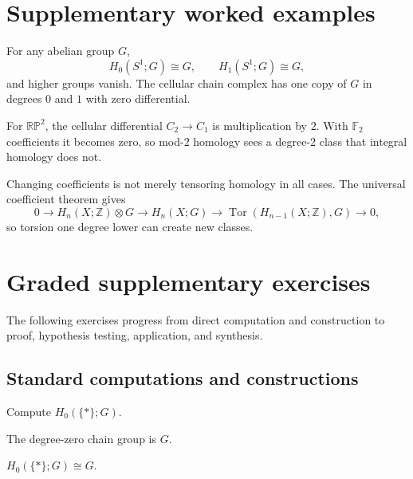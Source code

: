 \section{Supplementary worked examples}
\label{sec:viii25-pedagogy}

\begin{example}\label{ex:viii25-ped-01}
For any abelian group $G$,
\[
H_0(S^1;G)\cong G,\qquad H_1(S^1;G)\cong G,
\]
and higher groups vanish. The cellular chain complex has one copy of $G$ in degrees $0$ and $1$ with zero differential.
\end{example}

\begin{example}\label{ex:viii25-ped-02}
For $\mathbb{RP}^2$, the cellular differential $C_2\to C_1$ is multiplication by $2$. With $\mathbb F_2$ coefficients it becomes zero, so mod-$2$ homology sees a degree-$2$ class that integral homology does not.
\end{example}

\begin{example}\label{ex:viii25-ped-03}
Changing coefficients is not merely tensoring homology in all cases. The universal coefficient theorem gives
\[
0\to H_n(X;\mathbb Z)\otimes G\to H_n(X;G)\to
\operatorname{Tor}(H_{n-1}(X;\mathbb Z),G)\to0,
\]
so torsion one degree lower can create new classes.
\end{example}

\section{Graded supplementary exercises}
The following exercises progress from direct computation and construction to proof, hypothesis testing, application, and synthesis.

\subsection*{Standard computations and constructions}

\begin{exercise}\label{exr:viii25-ped-01}
Compute $H_0(\{*\};G)$.
\end{exercise}
\begin{hint}
The degree-zero chain group is $G$.
\end{hint}
\begin{solution}
$H_0(\{*\};G)\cong G$.
\end{solution}

